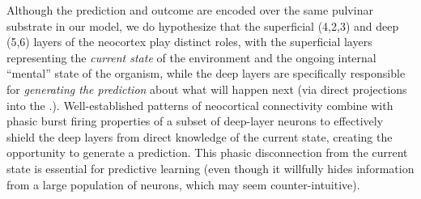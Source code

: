 \documentclass[11pt,twoside]{article}
\newif\myifpdf
\begin{document}
\begin{itemize}
Although the prediction and outcome are encoded over the same pulvinar substrate in our model, we do hypothesize that the superficial (4,2,3) and deep (5,6) layers of the neocortex play distinct roles, with the superficial layers representing the {\em current state} of the environment and the ongoing internal ``mental'' state of the organism, while the deep layers are specifically responsible for {\em generating the prediction} about what will happen next (via direct projections into the .).  Well-established patterns of neocortical connectivity combine with phasic burst firing properties of a subset of deep-layer neurons to effectively shield the deep layers from direct knowledge of the current state, creating the opportunity to generate a prediction. This phasic disconnection from the current state is essential for predictive learning (even though it willfully hides information from a large population of neurons, which may seem counter-intuitive).


\end{itemize}
\end{document}
